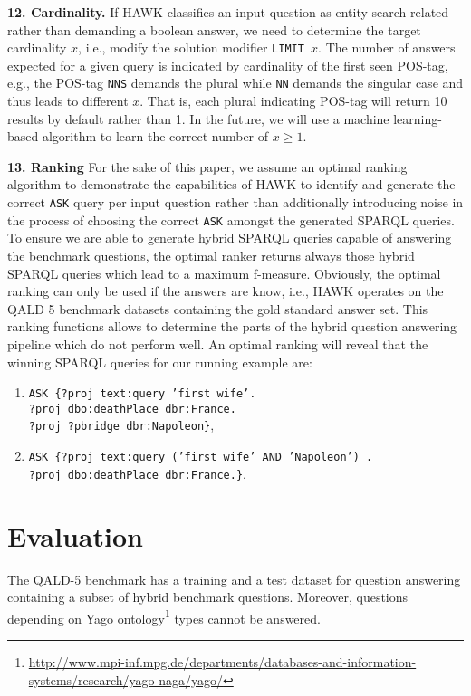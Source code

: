 \documentclass{llncs}
\begin{document}
\textbf{12. Cardinality.}
If HAWK classifies an input question as entity search related rather than demanding a boolean answer, we need to determine the target cardinality $x$, i.e., modify the solution modifier \texttt{LIMIT $x$}. 
The number of answers expected for a given query is indicated by cardinality of the first seen POS-tag, e.g., the POS-tag \texttt{NNS} demands the plural while \texttt{NN} demands the singular case and thus leads to different $x$.
That is, each plural indicating POS-tag will return 10 results by default rather than 1. 
In the future, we will use a machine learning-based algorithm to learn the correct number of $x \geq 1$.


\textbf{13. Ranking}
For the sake of this paper, we assume an optimal ranking algorithm to demonstrate the capabilities of HAWK to identify and generate the correct \texttt{ASK} query per input question rather than additionally introducing noise in the process of choosing the correct \texttt{ASK} amongst the generated SPARQL queries.
To ensure we are able to generate hybrid SPARQL queries capable of answering the benchmark questions, the optimal ranker returns always those hybrid SPARQL queries which lead to a maximum f-measure.  
Obviously, the optimal ranking can only be used if the answers are know, i.e., HAWK operates on the QALD 5 benchmark datasets containing the gold standard answer set.
This ranking functions allows to determine the parts of the hybrid question answering pipeline which do not perform well. 
An optimal ranking will reveal that the winning SPARQL queries for our running example are:
\begin{enumerate}
\item \texttt{ASK \{?proj text:query 'first wife'. \\?proj dbo:deathPlace dbr:France. \\?proj ?pbridge dbr:Napoleon\}}, 
\item \texttt{ASK \{?proj text:query ('first wife' AND 'Napoleon') .\\ ?proj dbo:deathPlace dbr:France.\}}.
\end{enumerate} 


\section{Evaluation}
\label{sec:evaluation}
\sloppy
The QALD-5 \cite{qald5} benchmark has a training and a test dataset for question answering containing a subset of hybrid benchmark questions.
Moreover, questions depending on Yago ontology\footnote{\url{http://www.mpi-inf.mpg.de/departments/databases-and-information-systems/research/yago-naga/yago/}} types cannot be answered.
\end{document}
